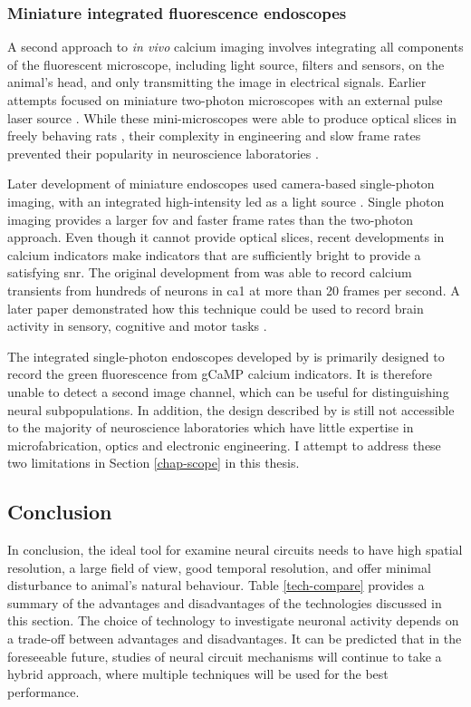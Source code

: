 \subsubsection{Miniature integrated fluorescence endoscopes}
A second approach to \textit{in vivo} calcium imaging involves integrating all components of the fluorescent microscope, including light source, filters and sensors, on the animal's head, and only transmitting the image in electrical signals. Earlier attempts focused on miniature two-photon microscopes with an external pulse laser source \citep{flusberg05, piyawattanametha09}. While these mini-microscopes were able to produce optical slices in freely behaving rats \citep{sawinski09}, their complexity in engineering and slow frame rates prevented their popularity in neuroscience laboratories \citep{hamel15, yang17}.

Later development of miniature endoscopes used camera-based single-photon imaging, with an integrated high-intensity \gls{led} as a light source \citep{ghosh11}. Single photon imaging provides a larger \gls{fov} and faster frame rates than the two-photon approach. Even though it cannot provide optical slices, recent developments in calcium indicators make indicators that are sufficiently bright to provide a satisfying \gls{snr}. The original development from \citet{ghosh11} was able to record calcium transients from hundreds of neurons in \gls{ca1} at more than 20 frames per second. A later paper demonstrated how this technique could be used to record brain activity in sensory, cognitive and motor tasks \citep{ziv13}.

The integrated single-photon endoscopes developed by \citet{ghosh11} is primarily designed to record the green fluorescence from gCaMP calcium indicators. It is therefore unable to detect a second image channel, which can be useful for distinguishing neural subpopulations. In addition, the design described by \citet{ghosh11} is still not accessible to the majority of neuroscience laboratories which have little expertise in microfabrication, optics and electronic engineering. I attempt to address these two limitations in Section \ref{chap-scope} in this thesis. 

\subsection{Conclusion}

In conclusion, the ideal tool for examine neural circuits needs to have high spatial resolution, a large field of view, good temporal resolution, and offer minimal disturbance to animal's natural behaviour. Table \ref{tech-compare} provides a summary of the advantages and disadvantages of the technologies discussed in this section. The choice of technology to investigate neuronal activity depends on a trade-off between advantages and disadvantages. It can be predicted that in the foreseeable future, studies of neural circuit mechanisms will continue to take a hybrid approach, where multiple techniques will be used for the best performance. 

